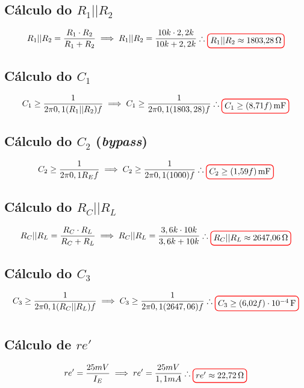 \documentclass[12pt,openany,oneside,a4paper]{abntex2}
\begin{document}
\subsection{Cálculo do $R_{1} || R_{2}$}
\[
R_{1} || R_{2} = \frac{R_{1} \cdot R_{2}}{R_{1} + R_{2}} \implies R_{1} || R_{2} = \frac{10k \cdot 2,2k}{10k + 2,2k} \therefore \tikz[baseline]{\node[draw=red, thick, rounded corners] {$R_{1} || R_{2} \approx 1803{,}28\,\Omega$};}
\]

\subsection{Cálculo do $C_{1}$}
\[
C_{1} \geq \frac{1}{2\pi0,1(R_{1} || R_{2})f} \implies C_{1} \geq \frac{1}{2\pi0,1(1803,28)f} \therefore \tikz[baseline]{\node[draw=red, thick, rounded corners] {$C_{1} \geq (8{,}71f)\,\text{mF}$};}
\]

\subsection{Cálculo do $C_{2}$ (\textit{bypass})}
\[
C_{2} \geq \frac{1}{2\pi0,1R_{E}f} \implies C_{2} \geq \frac{1}{2\pi0,1(1000)f} \therefore \tikz[baseline]{\node[draw=red, thick, rounded corners] {$C_{2} \geq (1{,}59f)\,\text{mF}$};}
\]

\subsection{Cálculo do $R_{C} || R_{L}$}
\[
R_{C} || R_{L} = \frac{R_{C} \cdot R_{L}}{R_{C} + R_{L}} \implies R_{C} || R_{L} = \frac{3,6k \cdot 10k}{3,6k + 10k} \therefore \tikz[baseline]{\node[draw=red, thick, rounded corners] {$R_{C} || R_{L} \approx 2647{,}06\,\Omega$};}
\]

\subsection{Cálculo do $C_{3}$}
\[
C_{3} \geq \frac{1}{2\pi0,1(R_{C} || R_{L})f} \implies C_{3} \geq \frac{1}{2\pi0,1(2647,06)f} \therefore \tikz[baseline]{\node[draw=red, thick, rounded corners] {$C_{3} \geq (6{,}02f)\cdot 10^{-4}\,\text{F}$};}
\]

\section{}

\subsection{Cálculo de $re'$}
\[
re' = \frac{25mV}{I_{E}} \implies re' = \frac{25mV}{1,1mA} \therefore \tikz[baseline]{\node[draw=red, thick, rounded corners] {$re' \approx 22{,}72\,\Omega$};}
\]
\end{document}
